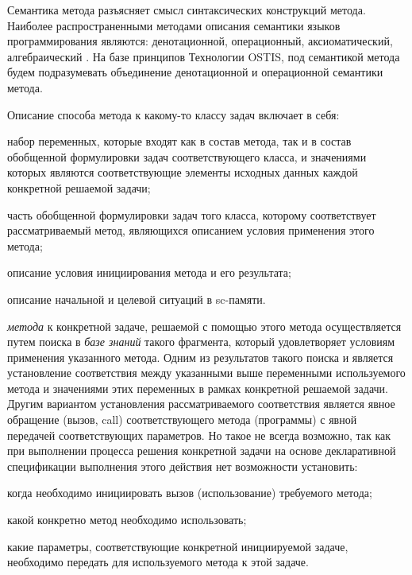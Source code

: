 Семантика метода разъясняет смысл синтаксических конструкций метода. Наиболее распространенными методами описания семантики языков программирования являются: денотационной, операционный, аксиоматический, алгебраический \cite{Orlov2013}. На базе принципов Технологии OSTIS, под семантикой метода будем подразумевать объединение денотационной и операционной семантики метода.

Описание способа  метода к какому-то классу задач включает в себя:
\begin{textitemize}
    \item набор переменных, которые входят как в состав метода, так и в состав обобщенной формулировки задач соответствующего класса, и значениями которых являются соответствующие элементы исходных данных каждой конкретной решаемой задачи;
    \item часть обобщенной формулировки задач того класса, которому соответствует рассматриваемый метод, являющихся описанием условия применения этого метода;
    \item описание условия инициирования метода и его результата;
    \item описание начальной и целевой ситуаций в sc-памяти.
\end{textitemize}

 \textit{метода} к конкретной задаче, решаемой с помощью этого метода осуществляется путем поиска в \textit{базе знаний} такого фрагмента, который удовлетворяет условиям применения указанного метода. Одним из результатов такого поиска и является установление соответствия между указанными выше переменными используемого метода и значениями этих переменных в рамках конкретной решаемой задачи. Другим вариантом установления рассматриваемого соответствия является явное обращение (вызов, call) соответствующего метода (программы) с явной передачей соответствующих параметров. Но такое не всегда возможно, так как при выполнении процесса решения конкретной задачи на основе декларативной спецификации выполнения этого действия нет возможности установить:
\begin{textitemize}
    \item когда необходимо инициировать вызов (использование) требуемого метода;
    \item какой конкретно метод необходимо использовать;
    \item какие параметры, соответствующие конкретной инициируемой задаче, необходимо передать для  используемого метода к этой задаче.
\end{textitemize}


